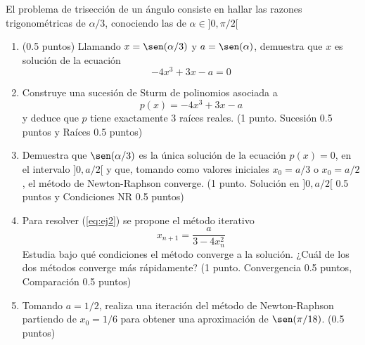\documentclass[12pt]{article}
\begin{document}
    \begin{ejercicio}[4 puntos]
        El problema de trisección de un ángulo consiste en hallar las razones trigonométricas de $\alpha/3$, conociendo las de $\alpha \in ]0, \pi/2[$
        \begin{enumerate}
          \item (0.5 puntos) Llamando \( x = \sen(\alpha/3) \) y \( a = \sen(\alpha) \), demuestra que $x$ es solución de la ecuación
          \begin{equation}\label{eq:ej2}
            -4x^3 + 3x - a = 0
          \end{equation}
          \item Construye una sucesión de Sturm de polinomios asociada a $$ p(x) = -4x^3 + 3x - a $$ y deduce que \( p \) tiene exactamente 3 raíces reales. (1 punto. Sucesión 0.5 puntos y Raíces 0.5 puntos)
          \item Demuestra que \( \sen(\alpha/3) \) es la única solución de la ecuación \( p(x) = 0 \), en el intervalo \( ]0, a/2[ \) y que, tomando como valores iniciales \( x_0 = a/3 \) o \( x_0 = a/2 \), el método de Newton-Raphson converge.
          (1 punto. Solución en $]0, a/2[$ 0.5 puntos y Condiciones NR 0.5 puntos)
          \item Para resolver (\ref{eq:ej2}) se propone el método iterativo
          \[
          x_{n+1} = \frac{a}{3 - 4x_n^2}
          \]
          Estudia bajo qué condiciones el método converge a la solución. ¿Cuál de los dos métodos converge más rápidamente? (1 punto. Convergencia 0.5 puntos, Comparación 0.5 puntos)
          \item Tomando \( a = 1/2 \), realiza una iteración del método de Newton-Raphson partiendo de \( x_0 = 1/6 \) para obtener una aproximación de \( \sen(\pi/18) \). (0.5 puntos)         
        \end{enumerate}
    \end{ejercicio}

    
        
\end{document}
